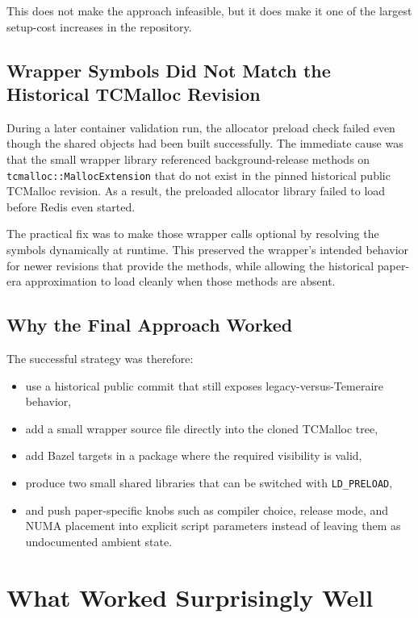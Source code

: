 \documentclass[a4paper,11pt]{article}
\begin{document}
This does not make the approach infeasible, but it does make it one of the
largest setup-cost increases in the repository.

\subsection{Wrapper Symbols Did Not Match the Historical TCMalloc Revision}

During a later container validation run, the allocator preload check failed
even though the shared objects had been built successfully. The immediate cause
was that the small wrapper library referenced background-release methods on
\texttt{tcmalloc::MallocExtension} that do not exist in the pinned historical
public TCMalloc revision. As a result, the preloaded allocator library failed
to load before Redis even started.

The practical fix was to make those wrapper calls optional by resolving the
symbols dynamically at runtime. This preserved the wrapper's intended behavior
for newer revisions that provide the methods, while allowing the historical
paper-era approximation to load cleanly when those methods are absent.

\subsection{Why the Final Approach Worked}

The successful strategy was therefore:

\begin{itemize}[leftmargin=1.5em]
  \item use a historical public commit that still exposes legacy-versus-Temeraire behavior,
  \item add a small wrapper source file directly into the cloned TCMalloc tree,
  \item add Bazel targets in a package where the required visibility is valid,
  \item produce two small shared libraries that can be switched with \texttt{LD\_PRELOAD},
  \item and push paper-specific knobs such as compiler choice, release mode,
  and NUMA placement into explicit script parameters instead of leaving them as
  undocumented ambient state.
\end{itemize}

\section{What Worked Surprisingly Well}
\end{document}
